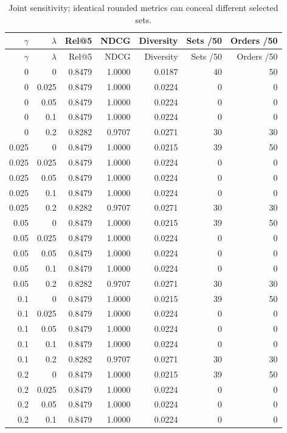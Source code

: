 \documentclass[11pt,a4paper]{article}
\begin{document}
\begin{footnotesize}\begin{longtable}{rrrrrrr}
\caption{Joint sensitivity; identical rounded metrics can conceal different selected sets.}\\
\toprule
$\gamma$ & $\lambda$ & Rel@5 & NDCG & Diversity & Sets /50 & Orders /50\\\midrule\endfirsthead
\toprule $\gamma$ & $\lambda$ & Rel@5 & NDCG & Diversity & Sets /50 & Orders /50\\\midrule\endhead
0 & 0 & 0.8479 & 1.0000 & 0.0187 & 40 & 50\\
0 & 0.025 & 0.8479 & 1.0000 & 0.0224 & 0 & 0\\
0 & 0.05 & 0.8479 & 1.0000 & 0.0224 & 0 & 0\\
0 & 0.1 & 0.8479 & 1.0000 & 0.0224 & 0 & 0\\
0 & 0.2 & 0.8282 & 0.9707 & 0.0271 & 30 & 30\\
0.025 & 0 & 0.8479 & 1.0000 & 0.0215 & 39 & 50\\
0.025 & 0.025 & 0.8479 & 1.0000 & 0.0224 & 0 & 0\\
0.025 & 0.05 & 0.8479 & 1.0000 & 0.0224 & 0 & 0\\
0.025 & 0.1 & 0.8479 & 1.0000 & 0.0224 & 0 & 0\\
0.025 & 0.2 & 0.8282 & 0.9707 & 0.0271 & 30 & 30\\
0.05 & 0 & 0.8479 & 1.0000 & 0.0215 & 39 & 50\\
0.05 & 0.025 & 0.8479 & 1.0000 & 0.0224 & 0 & 0\\
0.05 & 0.05 & 0.8479 & 1.0000 & 0.0224 & 0 & 0\\
0.05 & 0.1 & 0.8479 & 1.0000 & 0.0224 & 0 & 0\\
0.05 & 0.2 & 0.8282 & 0.9707 & 0.0271 & 30 & 30\\
0.1 & 0 & 0.8479 & 1.0000 & 0.0215 & 39 & 50\\
0.1 & 0.025 & 0.8479 & 1.0000 & 0.0224 & 0 & 0\\
0.1 & 0.05 & 0.8479 & 1.0000 & 0.0224 & 0 & 0\\
0.1 & 0.1 & 0.8479 & 1.0000 & 0.0224 & 0 & 0\\
0.1 & 0.2 & 0.8282 & 0.9707 & 0.0271 & 30 & 30\\
0.2 & 0 & 0.8479 & 1.0000 & 0.0215 & 39 & 50\\
0.2 & 0.025 & 0.8479 & 1.0000 & 0.0224 & 0 & 0\\
0.2 & 0.05 & 0.8479 & 1.0000 & 0.0224 & 0 & 0\\
0.2 & 0.1 & 0.8479 & 1.0000 & 0.0224 & 0 & 0\\

\end{longtable}
\end{footnotesize}
\end{document}
